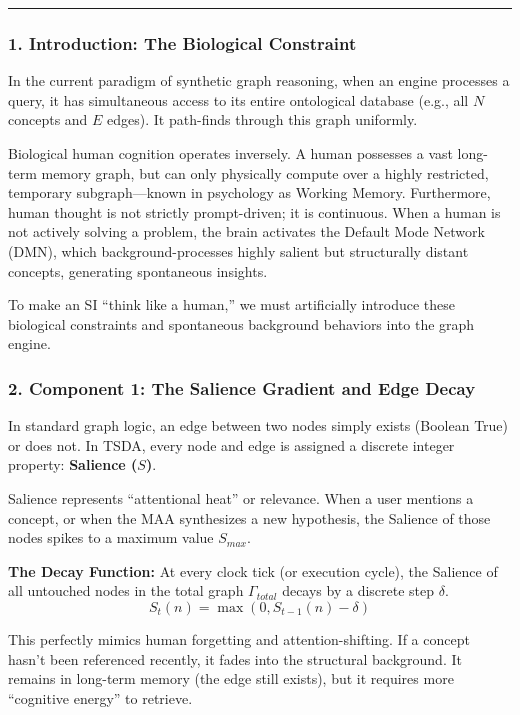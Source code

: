 \documentclass[
  11pt,
  a4paper,
]{article}
\begin{document}
\begin{center}\rule{0.5\linewidth}{0.5pt}\end{center}

\subsubsection{1. Introduction: The Biological
Constraint}\label{introduction-the-biological-constraint}

In the current paradigm of synthetic graph reasoning, when an engine
processes a query, it has simultaneous access to its entire ontological
database (e.g., all \(N\) concepts and \(E\) edges). It path-finds
through this graph uniformly.

Biological human cognition operates inversely. A human possesses a vast
long-term memory graph, but can only physically compute over a highly
restricted, temporary subgraph---known in psychology as Working Memory.
Furthermore, human thought is not strictly prompt-driven; it is
continuous. When a human is not actively solving a problem, the brain
activates the Default Mode Network (DMN), which background-processes
highly salient but structurally distant concepts, generating spontaneous
insights.

To make an SI ``think like a human,'' we must artificially introduce
these biological constraints and spontaneous background behaviors into
the graph engine.

\subsubsection{2. Component 1: The Salience Gradient and Edge
Decay}\label{component-1-the-salience-gradient-and-edge-decay}

In standard graph logic, an edge between two nodes simply exists
(Boolean True) or does not. In TSDA, every node and edge is assigned a
discrete integer property: \textbf{Salience (\(S\))}.

Salience represents ``attentional heat'' or relevance. When a user
mentions a concept, or when the MAA synthesizes a new hypothesis, the
Salience of those nodes spikes to a maximum value \(S_{max}\).

\textbf{The Decay Function:} At every clock tick (or execution cycle),
the Salience of all untouched nodes in the total graph
\(\Gamma_{total}\) decays by a discrete step \(\delta\).
\[ S_t(n) = \max(0, S_{t-1}(n) - \delta) \]

This perfectly mimics human forgetting and attention-shifting. If a
concept hasn't been referenced recently, it fades into the structural
background. It remains in long-term memory (the edge still exists), but
it requires more ``cognitive energy'' to retrieve.
\end{document}

